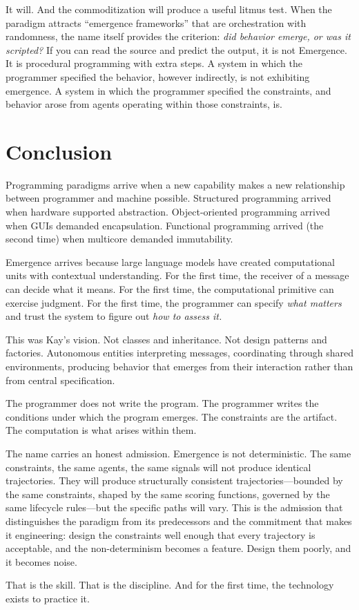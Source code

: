 \documentclass[11pt,twocolumn]{article}
\begin{document}
It will.  And the commoditization will produce a useful litmus test.
When the paradigm attracts ``emergence frameworks'' that are
orchestration with randomness, the name itself provides the criterion:
\emph{did behavior emerge, or was it scripted?}  If you can read the
source and predict the output, it is not Emergence.  It is procedural
programming with extra steps.  A system in which the programmer
specified the behavior, however indirectly, is not exhibiting emergence.
A system in which the programmer specified the constraints, and behavior
arose from agents operating within those constraints, is.

\section{Conclusion}
\label{sec:conclusion}

Programming paradigms arrive when a new capability makes a new
relationship between programmer and machine possible.  Structured
programming arrived when hardware supported abstraction.  Object-oriented
programming arrived when GUIs demanded encapsulation.  Functional
programming arrived (the second time) when multicore demanded
immutability.

Emergence arrives because large language models have created
computational units with contextual understanding.  For the first time,
the receiver of a message can decide what it means.  For the first
time, the computational primitive can exercise judgment.  For the first
time, the programmer can specify \emph{what matters} and trust the
system to figure out \emph{how to assess it.}

This was Kay's vision.  Not classes and inheritance.  Not design
patterns and factories.  Autonomous entities interpreting messages,
coordinating through shared environments, producing behavior that
emerges from their interaction rather than from central specification.

The programmer does not write the program.  The programmer writes the
conditions under which the program emerges.  The constraints are the
artifact.  The computation is what arises within them.

The name carries an honest admission.  Emergence is not deterministic.
The same constraints, the same agents, the same signals will not produce
identical trajectories.  They will produce structurally consistent
trajectories---bounded by the same constraints, shaped by the same
scoring functions, governed by the same lifecycle rules---but the
specific paths will vary.  This is the admission that distinguishes the
paradigm from its predecessors and the commitment that makes it
engineering: design the constraints well enough that every trajectory is
acceptable, and the non-determinism becomes a feature.  Design them
poorly, and it becomes noise.

That is the skill.  That is the discipline.  And for the first time, the
technology exists to practice it.



\end{document}
